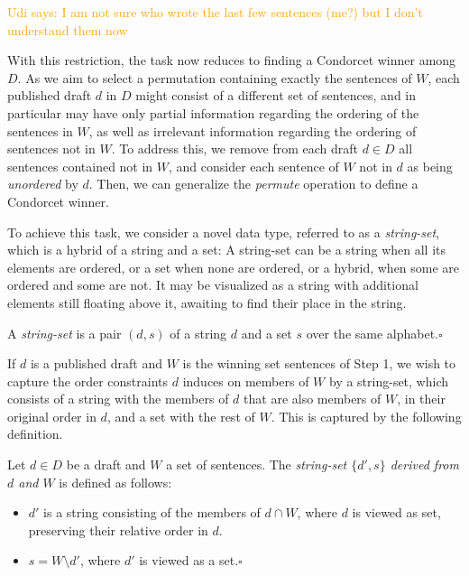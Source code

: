 \documentclass{llncs}
\newcommand{\udi}[1]{\textcolor{orange}{Udi says: #1}}
\newcommand{\qqed}{\hfill$\square$}
\begin{document}
\udi{I am not sure who wrote the last few sentences (me?) but I don't understand them now}

With this restriction, the task now reduces to finding a Condorcet winner among $D$. As we aim to select a permutation containing exactly the sentences of $W$,
each published draft $d$ in $D$ might consist of a different set of sentences, and in particular may have only partial information regarding the ordering of the sentences in $W$, as well as irrelevant information regarding the ordering of sentences not in $W$.  To address this, we remove from each draft $d \in D$ all sentences contained not in $W$, and consider each sentence of $W$ not in $d$ as being \emph{unordered} by $d$.  Then, we can generalize the \emph{permute} operation to define a Condorcet winner.

To achieve this task, we consider a novel data type, referred to as a \emph{string-set}, which is a hybrid of a string and a set:
  A string-set can be a string when all its elements are ordered,
  or a set when none are ordered,
  or a hybrid, when some are ordered and some are not.
It may be visualized as a string with additional elements still floating above it, awaiting to find their place in the string.

\begin{definition}
  A \emph{string-set} is a pair
  $(d, s)$
  of a string $d$ 
  and a set $s$ over the same alphabet.\qqed
\end{definition}

If $d$ is a published draft and $W$ is the winning set sentences of Step 1, we wish to capture the order constraints $d$ induces on members of $W$ by a string-set, which consists of a string with the members of $d$ that are also members of $W$, in their original order in $d$, and a set with the rest of $W$. This is captured by the following definition.

\begin{definition}
Let $d \in D$ be a draft and $W$ a set of sentences.
The \emph{string-set $\{d',s\}$ derived from $d$ and $W$} is defined as follows:
\begin{itemize}

\item
$d'$ is a string consisting of the members of $d \cap W$, where $d$ is viewed as set, preserving their relative order in $d$.

\item
$s = W \setminus d'$, where $d'$ is viewed as a set.\qqed

\end{itemize}
%
\end{definition}
\end{document}
